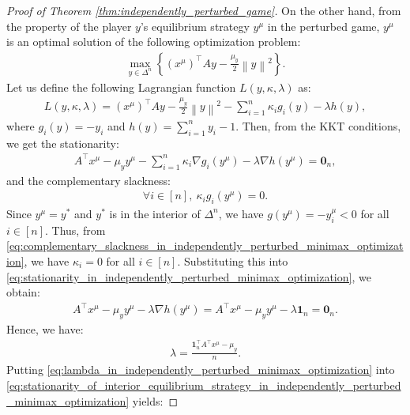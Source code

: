 \documentclass{article}
\newcommand{\bone}{\mathbf{1}}
\newcommand{\bzero}{\mathbf{0}}
\theoremstyle{plain}
\begin{document}
\begin{proof}[Proof of Theorem \ref{thm:independently_perturbed_game}]
    On the other hand, from the property of the player $y$'s equilibrium strategy $y^{\mu}$ in the perturbed game, $y^{\mu}$ is an optimal solution of the following optimization problem:
    \begin{align*}
        \max_{y\in \Delta^n}\left\{(x^{\mu})^{\top}Ay - \frac{\mu_y}{2}\left\|y\right\|^2\right\}.
    \end{align*}
    Let us define the following Lagrangian function $L(y, \kappa, \lambda)$ as:
    \begin{align*}
        L(y, \kappa, \lambda) = (x^{\mu})^{\top}Ay - \frac{\mu_y}{2}\left\|y\right\|^2 - \sum_{i=1}^n \kappa_ig_i(y) - \lambda h(y),
    \end{align*}
    where $g_i(y) = -y_i$ and $h(y) = \sum_{i=1}^ny_i - 1$.
    Then, from the KKT conditions, we get the stationarity:
    \begin{align}
        A^{\top}x^{\mu} - \mu_y y^{\mu} - \sum_{i=1}^n \kappa_i \nabla g_i(y^{\mu}) - \lambda \nabla h(y^{\mu}) = \bzero_n,
        \label{eq:stationarity_in_independently_perturbed_minimax_optimization}
    \end{align}
    and the complementary slackness:
    \begin{align}
        \forall i\in [n], ~\kappa_i g_i(y^{\mu}) = 0.
        \label{eq:complementary_slackness_in_independently_perturbed_minimax_optimization}
    \end{align}
    Since $y^{\mu} = y^{\ast}$ and $y^{\ast}$ is in the interior of $\Delta^n$, we have $g(y^{\mu}) = -y_i^{\mu} < 0$ for all $i\in [n]$.
    Thus, from \eqref{eq:complementary_slackness_in_independently_perturbed_minimax_optimization}, we have $\kappa_i = 0$ for all $i\in [n]$.
    Substituting this into \eqref{eq:stationarity_in_independently_perturbed_minimax_optimization}, we obtain:
    \begin{align}
        A^{\top}x^{\mu} - \mu_y y^{\mu} - \lambda \nabla h(y^{\mu}) = A^{\top}x^{\mu} - \mu_y y^{\mu} - \lambda \bone_n = \bzero_n.
        \label{eq:stationarity_of_interior_equilibrium_strategy_in_independently_perturbed_minimax_optimization}
    \end{align}
    Hence, we have:
    \begin{align}
        \lambda = \frac{\bone_n^{\top}A^{\top}x^{\mu} - \mu_y}{n}.
        \label{eq:lambda_in_independently_perturbed_minimax_optimization}
    \end{align}
    Putting \eqref{eq:lambda_in_independently_perturbed_minimax_optimization} into \eqref{eq:stationarity_of_interior_equilibrium_strategy_in_independently_perturbed_minimax_optimization} yields:

\end{proof}
\end{document}
